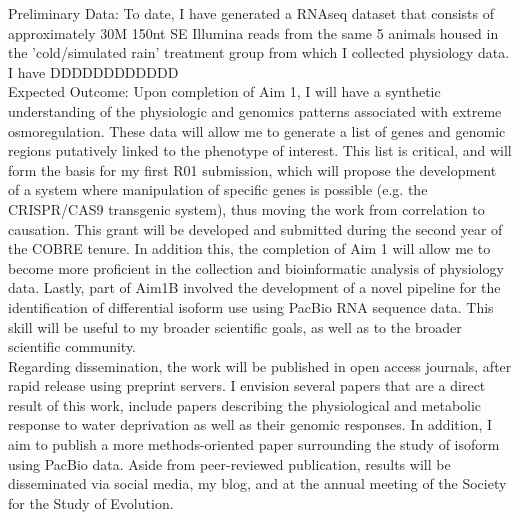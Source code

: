 \documentclass[11pt]{article}
\begin{document}
Preliminary Data: To date, I have generated a RNAseq dataset that consists of approximately 30M 150nt SE Illumina reads from the same 5 animals housed in the 'cold/simulated rain' treatment group from which I collected physiology data. I have DDDDDDDDDDDD \\

Expected Outcome: Upon completion of Aim 1, I will have a synthetic understanding of the physiologic and genomics patterns associated with extreme osmoregulation. These data will allow me to generate a list of genes and genomic regions putatively linked to the phenotype of interest. This list is critical, and will form the basis for my first R01 submission, which will propose the development of a system where manipulation of specific genes is possible (e.g. the CRISPR/CAS9 transgenic system), thus moving the work from correlation to causation. This grant will be developed and submitted during the second year of the COBRE tenure. In addition this, the completion of Aim 1 will allow me to become more proficient in the collection and bioinformatic analysis of physiology data. Lastly, part of Aim1B involved the development of a novel pipeline for the identification of differential isoform use using PacBio RNA sequence data. This skill will be useful to my broader scientific goals, as well as to the broader scientific community.    \\

Regarding dissemination, the work will be published in open access journals, after rapid release using preprint servers. I envision several papers that are a direct result of this work, include papers describing the physiological and metabolic response to water deprivation as well as their genomic responses. In addition, I aim to publish a more methods-oriented paper surrounding the study of isoform using PacBio data. Aside from peer-reviewed publication, results will be disseminated via social media, my blog, and at the annual meeting of the Society for the Study of Evolution. \\       

%
%
%
%
\end{document}
